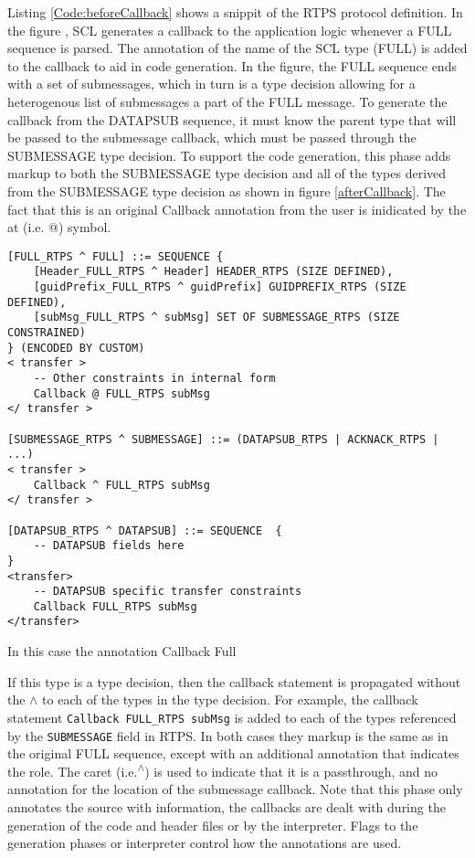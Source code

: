 \documentclass[12pt,oneside,letterpaper]{article}
\begin{document}
Listing \ref{Code:beforeCallback} shows a snippit of the RTPS protocol definition. In the figure , SCL generates a callback to the application logic whenever a FULL sequence is parsed. The annotation of the name of the SCL type (FULL) is added to the callback to aid in code generation. In the figure, the FULL sequence ends with a set of submessages, which in turn is a type decision allowing for a heterogenous list of submessages a part of the FULL message. To generate the callback from the DATAPSUB sequence, it must know the parent type that will be passed to the submessage callback, which must be passed through the SUBMESSAGE type decision. To support the code generation, this phase adds markup to both the SUBMESSAGE type decision and all of the types derived from the SUBMESSAGE type decision as shown in figure \ref{afterCallback}. The fact that this is an original Callback annotation from the user is inidicated by the at (i.e. @) symbol.

\begin{lstlisting}[language=SCL2,style=mystyle,frame=none,float,
caption=After Callback Annotation,label=Code:afterCallback, xleftmargin=3.5ex]
[FULL_RTPS ^ FULL] ::= SEQUENCE {
    [Header_FULL_RTPS ^ Header] HEADER_RTPS (SIZE DEFINED),
    [guidPrefix_FULL_RTPS ^ guidPrefix] GUIDPREFIX_RTPS (SIZE DEFINED),
    [subMsg_FULL_RTPS ^ subMsg] SET OF SUBMESSAGE_RTPS (SIZE CONSTRAINED)
} (ENCODED BY CUSTOM)
< transfer >
    -- Other constraints in internal form
    Callback @ FULL_RTPS subMsg
</ transfer >

[SUBMESSAGE_RTPS ^ SUBMESSAGE] ::= (DATAPSUB_RTPS | ACKNACK_RTPS |  ...)
< transfer >
    Callback ^ FULL_RTPS subMsg
</ transfer >
        
[DATAPSUB_RTPS ^ DATAPSUB] ::= SEQUENCE  {
    -- DATAPSUB fields here
}
<transfer>
    -- DATAPSUB specific transfer constraints
    Callback FULL_RTPS subMsg
</transfer>
\end{lstlisting}

In this case the annotation Callback Full

If this type is a type decision, then the callback statement is propagated without the $\wedge$ to each of the types in the type decision. For example, the callback statement \texttt{Callback FULL\_RTPS subMsg} is added to each of the types referenced by the \texttt{SUBMESSAGE} field in RTPS. In both cases they markup is the same as in the original FULL sequence, except with an additional annotation that indicates the role. The caret (i.e.\textsuperscript{$\wedge$}) is used to indicate that it is a passthrough, and no annotation for the location of the submessage callback.  Note that this phase only annotates the source with information, the callbacks are dealt with during the generation of the code and header files or by the interpreter. Flags to the generation phases or interpreter control how the annotations are used.
\end{document}
